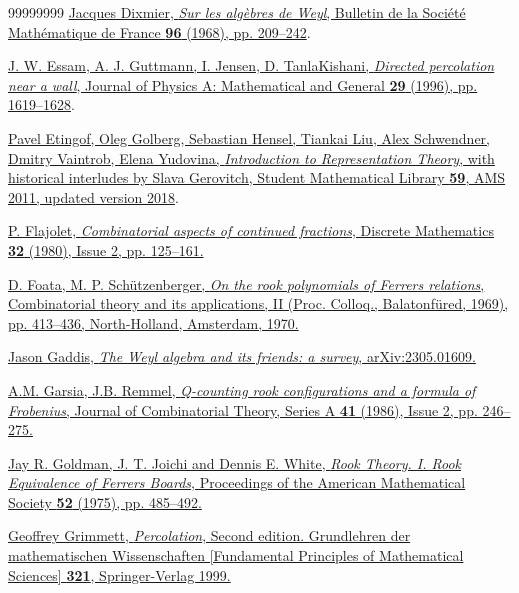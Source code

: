 \documentclass[numbers=enddot,12pt,final,onecolumn,notitlepage]{scrartcl}%
\theoremstyle{definition}
\begin{document}
\begin{thebibliography}{99999999}
\href{https://doi.org/10.24033/bsmf.1667}{Jacques Dixmier, \textit{Sur les alg\`ebres de Weyl}, Bulletin de la Soci\'et\'e Math\'ematique de France \textbf{96} (1968), pp. 209--242}.

\href{https://iopscience.iop.org/article/10.1088/0305-4470/29/8/010/pdf}
{J. W. Essam, A. J. Guttmann, I. Jensen, D. TanlaKishani, \textit{Directed percolation near a wall}, Journal of Physics A: Mathematical and General \textbf{29} (1996), pp. 1619--1628}.

\href{http://www-math.mit.edu/~etingof/reprbook.pdf}{Pavel Etingof, Oleg
Golberg, Sebastian Hensel, Tiankai Liu, Alex Schwendner, Dmitry Vaintrob,
Elena Yudovina, \textit{Introduction to Representation Theory}, with
historical interludes by Slava Gerovitch, Student Mathematical Library
\textbf{59}, AMS 2011, updated version 2018}.

\href{https://doi.org/10.1016/0012-365X(80)90050-3}{P. Flajolet,
\textit{Combinatorial aspects of continued fractions}, Discrete Mathematics \textbf{32} (1980), Issue 2, pp. 125--161.}

\href{https://irma.math.unistra.fr/~foata/paper/pub13.pdf}
{D. Foata, M. P.
Sch\"{u}tzenberger, \textit{On the rook polynomials of Ferrers relations},
Combinatorial theory and its applications, II (Proc. Colloq.,
Balatonf\"{u}red, 1969), pp. 413--436, North-Holland, Amsterdam, 1970.}

\href{https://arxiv.org/abs/2305.01609}{Jason Gaddis,
\textit{The Weyl algebra and its friends: a survey},
arXiv:2305.01609.}

\href{https://doi.org/10.1016/0097-3165(86)90083-X}{A.M. Garsia, J.B. Remmel, \textit{Q-counting rook configurations and a formula of Frobenius}, Journal of Combinatorial Theory, Series A \textbf{41} (1986), Issue 2, pp. 246--275.}

\href{https://www.ams.org/journals/proc/1975-052-01/S0002-9939-1975-0429578-4/S0002-9939-1975-0429578-4.pdf}{Jay R. Goldman, J. T. Joichi and Dennis E. White,
\textit{Rook Theory. I. Rook Equivalence of Ferrers Boards},
Proceedings of the American Mathematical Society \textbf{52} (1975), pp. 485--492.} 

\href{https://link.springer.com/book/10.1007/978-3-662-03981-6}
{Geoffrey Grimmett, \textit{Percolation}, Second edition. Grundlehren der mathematischen Wissenschaften [Fundamental Principles of Mathematical Sciences] \textbf{321}, Springer-Verlag 1999.}


\end{thebibliography}
\end{document}
